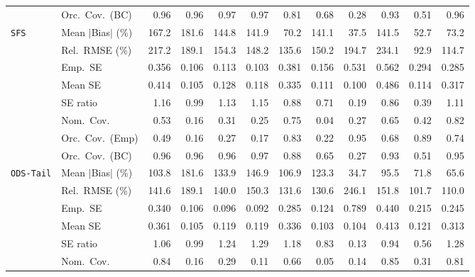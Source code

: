 \begin{landscape}
\begin{longtable}{llrrrrrrrrrr}
 & Orc.\ Cov.\ (BC) & \cellcolor{rankthree}0.96 & \cellcolor{ranktwo}0.96 & 0.97 & 0.97 & 0.81 & 0.68 & 0.28 & 0.93 & 0.51 & \cellcolor{rankone}0.96 \\
\addlinespace[2pt]
\quad \texttt{SFS} & Mean $|$Bias$|$ (\%) & 167.2 & 181.6 & 144.8 & 141.9 & \cellcolor{rankthree}70.2 & 141.1 & \cellcolor{rankone}37.5 & 141.5 & \cellcolor{ranktwo}52.7 & 73.2 \\
 & Rel.\ RMSE (\%) & 217.2 & 189.1 & 154.3 & 148.2 & \cellcolor{rankthree}135.6 & 150.2 & 194.7 & 234.1 & \cellcolor{rankone}92.9 & \cellcolor{ranktwo}114.7 \\
 & Emp.\ SE & 0.356 & 0.106 & 0.113 & 0.103 & 0.381 & 0.156 & 0.531 & 0.562 & 0.294 & 0.285 \\
 & Mean SE & 0.414 & 0.105 & 0.128 & 0.118 & 0.335 & 0.111 & 0.100 & 0.486 & 0.114 & 0.317 \\
 & SE ratio & 1.16 & \cellcolor{rankone}0.99 & 1.13 & 1.15 & \cellcolor{rankthree}0.88 & 0.71 & 0.19 & 0.86 & 0.39 & \cellcolor{ranktwo}1.11 \\
 & Nom.\ Cov. & 0.53 & 0.16 & 0.31 & 0.25 & \cellcolor{ranktwo}0.75 & 0.04 & 0.27 & \cellcolor{rankthree}0.65 & 0.42 & \cellcolor{rankone}0.82 \\
 & Orc.\ Cov.\ (Emp) & 0.49 & 0.16 & 0.27 & 0.17 & \cellcolor{rankthree}0.83 & 0.22 & \cellcolor{rankone}0.95 & 0.68 & \cellcolor{ranktwo}0.89 & 0.74 \\
 & Orc.\ Cov.\ (BC) & 0.96 & \cellcolor{ranktwo}0.96 & \cellcolor{rankthree}0.96 & 0.97 & 0.88 & 0.65 & 0.27 & 0.93 & 0.51 & \cellcolor{rankone}0.95 \\
\addlinespace[2pt]
\quad \texttt{ODS-Tail} & Mean $|$Bias$|$ (\%) & 103.8 & 181.6 & 133.9 & 146.9 & 106.9 & 123.3 & \cellcolor{rankone}34.7 & 95.5 & \cellcolor{rankthree}71.8 & \cellcolor{ranktwo}65.6 \\
 & Rel.\ RMSE (\%) & 141.6 & 189.1 & 140.0 & 150.3 & 131.6 & \cellcolor{rankthree}130.6 & 246.1 & 151.8 & \cellcolor{rankone}101.7 & \cellcolor{ranktwo}110.0 \\
 & Emp.\ SE & 0.340 & 0.106 & 0.096 & 0.092 & 0.285 & 0.124 & 0.789 & 0.440 & 0.215 & 0.245 \\
 & Mean SE & 0.361 & 0.105 & 0.119 & 0.119 & 0.336 & 0.103 & 0.104 & 0.413 & 0.121 & 0.313 \\
 & SE ratio & \cellcolor{rankthree}1.06 & \cellcolor{rankone}0.99 & 1.24 & 1.29 & 1.18 & 0.83 & 0.13 & \cellcolor{ranktwo}0.94 & 0.56 & 1.28 \\
 & Nom.\ Cov. & \cellcolor{ranktwo}0.84 & 0.16 & 0.29 & 0.11 & 0.66 & 0.05 & 0.14 & \cellcolor{rankone}0.85 & 0.31 & \cellcolor{rankthree}0.81 \\

\end{longtable}
\end{landscape}
